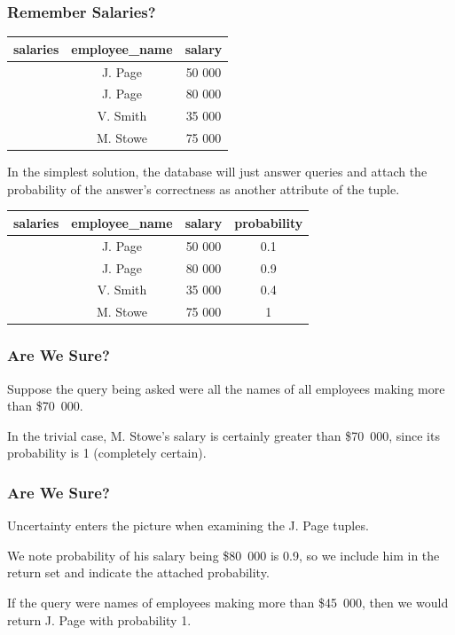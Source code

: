 \begin{frame}
\frametitle{Remember Salaries?}

\begin{table}[h]\begin{center}
        \begin{tabular}{r | c  c} 
					salaries & employee\_name & salary \\ \hline
	           		 & J. Page  & 50 000 \\ 
	         		 & J. Page  & 80 000 \\ 
					 & V. Smith & 35 000 \\ 
					 & M. Stowe & 75 000 \\ 
        \end{tabular}
\end{center}\end{table}

 In the simplest solution, the database will just answer queries and attach the probability of the answer's correctness as another attribute of the tuple.

\begin{table}[h]\begin{center}
        \begin{tabular}{r | c  c  c} 
					salaries & employee\_name & salary & probability\\ \hline
	           		 & J. Page  & 50 000 & 0.1 \\ 
	         		 & J. Page  & 80 000 & 0.9 \\ 
					 & V. Smith & 35 000 & 0.4 \\ 
					 & M. Stowe & 75 000 & 1 \\ 
        \end{tabular}
\end{center}\end{table}


\end{frame}


\begin{frame}
\frametitle{Are We Sure?}

Suppose the query being asked were all the names of all employees making more than \$70~000. 

In the trivial case, M. Stowe's salary is certainly greater than \$70~000, since its probability is 1 (completely certain). 

\end{frame}


\begin{frame}
\frametitle{Are We Sure?}

Uncertainty enters the picture when examining the J. Page tuples. 

We note probability of his salary being \$80~000 is 0.9, so we include him in the return set and indicate the attached probability.

If the query were names of employees making more than \$45~000, then we would return J. Page with probability 1.

\end{frame}


